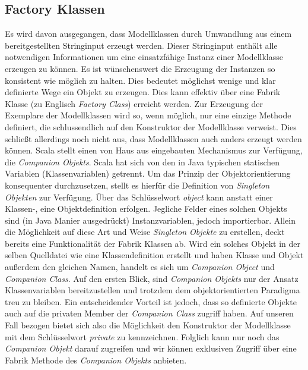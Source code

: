 \subsection{Factory Klassen}
Es wird davon ausgegangen, dass Modellklassen durch Umwandlung aus einem bereitgestellten Stringinput erzeugt werden. Dieser Stringinput enthält alle notwendigen Informationen um eine einsatzfähige Instanz einer Modellklasse erzeugen zu können. Es ist wünschenswert die Erzeugung der Instanzen so konsistent wie möglich zu halten. Dies bedeutet möglichst wenige und klar definierte Wege ein Objekt zu erzeugen. Dies kann effektiv über eine Fabrik Klasse (zu Englisch \textit{Factory Class}) erreicht werden. Zur Erzeugung der Exemplare der Modellklassen wird so, wenn möglich, nur eine einzige Methode definiert, die schlussendlich auf den Konstruktor der Modellklasse verweist. Dies schließt allerdings noch nicht aus, dass Modellklassen auch anders erzeugt werden können. Scala stellt einen von Haus aus eingebauten Mechanismus zur Verfügung, die \textit{Companion Objekts}. Scala hat sich von den in Java typischen statischen Variablen (Klassenvariablen) getrennt. Um das Prinzip der Objektorientierung konsequenter durchzusetzen, stellt es hierfür die Definition von \textit{Singleton Objekten} zur Verfügung. Über das Schlüsselwort \textit{object} kann anstatt einer Klassen-, eine Objektdefinition erfolgen. Jegliche Felder eines solchen Objekts sind (in Java Manier ausgedrückt) Instanzvariablen, jedoch importierbar. Allein die Möglichkeit auf diese Art und Weise \textit{Singleton Objekte} zu erstellen, deckt bereits eine Funktionalität der Fabrik Klassen ab. Wird ein solches Objekt in der selben Quelldatei wie eine Klassendefinition erstellt und haben Klasse und Objekt außerdem den gleichen Namen, handelt es sich um \textit{Companion Object} und \textit{Companion Class}. Auf den ersten Blick, sind \textit{Companion Objekts} nur der Ansatz Klassenvariablen bereitzustellen und trotzdem dem objektorientierten Paradigma treu zu bleiben. Ein entscheidender Vorteil ist jedoch, dass so definierte Objekte auch auf die privaten Member der \textit{Companion Class} zugriff haben. Auf unseren Fall bezogen bietet sich also die Möglichkeit den Konstruktor der Modellklasse mit dem Schlüsselwort \textit{private} zu kennzeichnen. Folglich kann nur noch das \textit{Companion Objekt} darauf zugreifen und wir können exklusiven Zugriff über eine Fabrik Methode des \textit{Companion Objekts} anbieten. 
